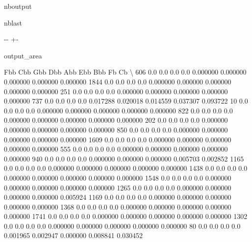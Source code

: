 \documentclass[letterpaper,10pt,english]{sphinxmanual}
\newlength\nbsphinxcodecellspacing
\begin{document}
\begin{sphinxuseclass}{nboutput}
\begin{sphinxuseclass}{nblast}
{

\kern-\sphinxverbatimsmallskipamount\kern-\baselineskip
\kern+\FrameHeightAdjust\kern-\fboxrule
\vspace{\nbsphinxcodecellspacing}

\begin{sphinxuseclass}{output_area}
\begin{sphinxuseclass}{}


\begin{sphinxVerbatim}[commandchars=\\\{\}]
\llap{\color{nbsphinxout}[12]:\,\hspace{\fboxrule}\hspace{\fboxsep}}      Fbb  Cbb  Gbb  Dbb       Abb       Ebb       Bbb        Fb        Cb  \textbackslash{}
606   0.0  0.0  0.0  0.0  0.000000  0.000000  0.000000  0.000000  0.000000
1844  0.0  0.0  0.0  0.0  0.000000  0.000000  0.000000  0.000000  0.000000
251   0.0  0.0  0.0  0.0  0.000000  0.000000  0.000000  0.000000  0.000000
737   0.0  0.0  0.0  0.0  0.017288  0.020018  0.014559  0.037307  0.093722
10    0.0  0.0  0.0  0.0  0.000000  0.000000  0.000000  0.000000  0.000000
822   0.0  0.0  0.0  0.0  0.000000  0.000000  0.000000  0.000000  0.000000
202   0.0  0.0  0.0  0.0  0.000000  0.000000  0.000000  0.000000  0.000000
850   0.0  0.0  0.0  0.0  0.000000  0.000000  0.000000  0.000000  0.000000
1609  0.0  0.0  0.0  0.0  0.000000  0.000000  0.000000  0.000000  0.000000
555   0.0  0.0  0.0  0.0  0.000000  0.000000  0.000000  0.000000  0.000000
940   0.0  0.0  0.0  0.0  0.000000  0.000000  0.000000  0.005703  0.002852
1165  0.0  0.0  0.0  0.0  0.000000  0.000000  0.000000  0.000000  0.000000
1438  0.0  0.0  0.0  0.0  0.000000  0.000000  0.000000  0.000000  0.000000
1548  0.0  0.0  0.0  0.0  0.000000  0.000000  0.000000  0.000000  0.000000
1265  0.0  0.0  0.0  0.0  0.000000  0.000000  0.000000  0.000000  0.005924
1169  0.0  0.0  0.0  0.0  0.000000  0.000000  0.000000  0.000000  0.000000
1368  0.0  0.0  0.0  0.0  0.000000  0.000000  0.000000  0.000000  0.000000
1741  0.0  0.0  0.0  0.0  0.000000  0.000000  0.000000  0.000000  0.000000
1302  0.0  0.0  0.0  0.0  0.000000  0.000000  0.000000  0.000000  0.000000
80    0.0  0.0  0.0  0.0  0.001965  0.002947  0.000000  0.008841  0.030452


\end{sphinxVerbatim}
\end{sphinxuseclass}
\end{sphinxuseclass}}
\end{sphinxuseclass}
\end{sphinxuseclass}
\end{document}
